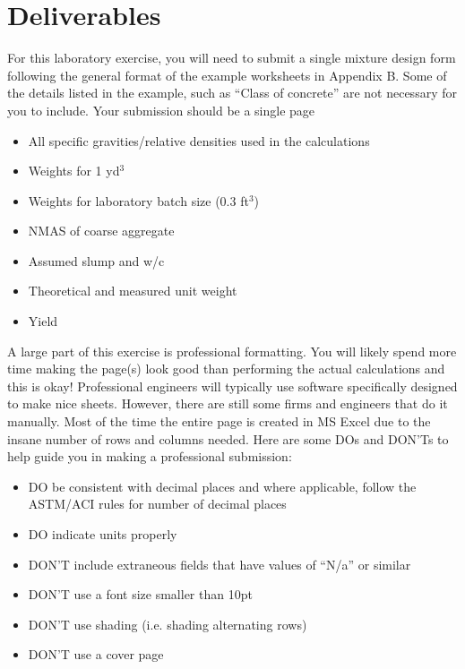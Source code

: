 \documentclass[12pt]{article}
\begin{document}
\section{Deliverables}
For this laboratory exercise, you will need to submit a single mixture design form following the general format of the example worksheets in Appendix B. Some of the details listed in the example, such as ``Class of concrete'' are not necessary for you to include. Your submission should be a single page
\begin{itemize}
    \item All specific gravities/relative densities used in the calculations
    \item Weights for 1 yd$^3$
    \item Weights for laboratory batch size (0.3 ft$^3$)
    \item NMAS of coarse aggregate
    \item Assumed slump and w/c
    \item Theoretical and measured unit weight
    \item Yield
\end{itemize}

A large part of this exercise is professional formatting. You will likely spend more time making the page(s) look good than performing the actual calculations and this is okay! Professional engineers will typically use software specifically designed to make nice sheets. However, there are still some firms and engineers that do it manually. Most of the time the entire page is created in MS Excel due to the insane number of rows and columns needed. Here are some DOs and DON'Ts to help guide you in making a professional submission:

\begin{itemize}
    \item DO be consistent with decimal places and where applicable, follow the ASTM/ACI rules for number of decimal places
    \item DO indicate units properly
    \item DON'T include extraneous fields that have values of ``N/a'' or similar
    \item DON'T use a font size smaller than 10pt
    \item DON'T use shading (i.e. shading alternating rows)
    \item DON'T use a cover page
\end{itemize}

%
%
\end{document}

